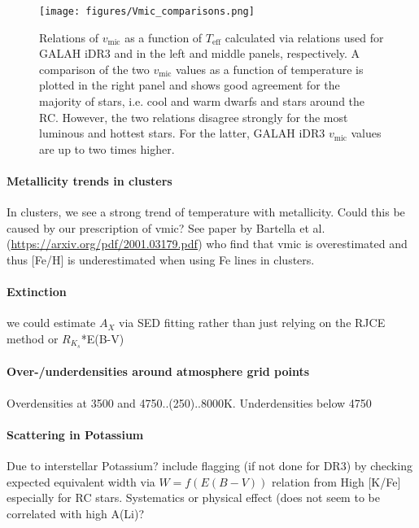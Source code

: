 \documentclass[fleqn,usenatbib,useAMS]{mnras}
\begin{document}
\begin{figure}
\centering
\texttt{[image: figures/Vmic\_comparisons.png]}
\caption[{Comparison of $v_\text{mic}$ calculated via relations used for GALAH iDR3 and \citet{DutraFerreira2016}}]{Relations of $v_\text{mic}$ as a function of $T_\text{eff}$ calculated via relations used for GALAH iDR3 and \citet{DutraFerreira2016} in the left and middle panels, respectively. A comparison of the two $v_\text{mic}$ values as a function of temperature is plotted in the right panel and shows good agreement for the majority of stars, i.e. cool and warm dwarfs and stars around the RC. However, the two relations disagree strongly for the most luminous and hottest stars. For the latter, GALAH iDR3 $v_\text{mic}$ values are up to two times higher.}
\label{fig:vmic_comparison}
\end{figure}

\paragraph*{Metallicity trends in clusters} In clusters, we see a strong trend of temperature with metallicity. Could this be caused by our prescription of vmic? See paper by Bartella et al. (\url{https://arxiv.org/pdf/2001.03179.pdf}) who find that vmic is overestimated and thus [Fe/H] is underestimated when using Fe lines in clusters.

\paragraph*{Extinction} we could estimate $A_X$ via SED fitting rather than just relying on the RJCE method or $R_{K_s}$*E(B-V)

\paragraph*{Over-/underdensities around atmosphere grid points} Overdensities at 3500 and 4750..(250)..8000K. Underdensities below 4750

\paragraph*{Scattering in Potassium} Due to interstellar Potassium? include flagging (if not done for DR3) by checking expected equivalent width via $W = f(E(B-V))$ relation from \citet{Munari1997} High [K/Fe] especially for RC stars. Systematics or physical effect (does not seem to be correlated with high A(Li)?
\end{document}
